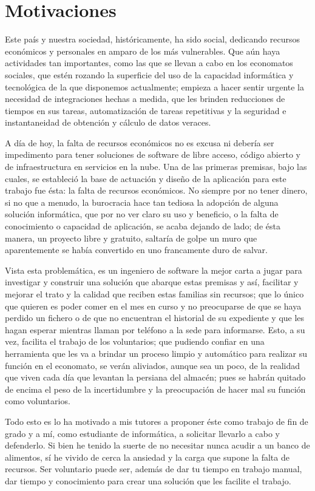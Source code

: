\section{Motivaciones}
Este país y nuestra sociedad, históricamente, ha sido social, dedicando recursos económicos y personales en amparo de los más vulnerables. Que aún haya actividades tan importantes, como las que se llevan a cabo en los economatos sociales, que estén rozando la superficie del uso de la capacidad informática y tecnológica de la que disponemos actualmente; empieza a hacer sentir urgente la necesidad de integraciones hechas a medida, que les brinden reducciones de tiempos en sus tareas, automatización de tareas repetitivas y la seguridad e instantaneidad de obtención y cálculo de datos veraces.
\vspace{1em}
\par A día de hoy, la falta de recursos económicos no es excusa ni debería ser impedimento para tener soluciones de software de libre acceso, código abierto y de infraestructura en servicios en la nube. Una de las primeras premisas, bajo las cuales, se estableció la base de actuación y diseño de la aplicación para este trabajo fue ésta: la falta de recursos económicos. No siempre por no tener dinero, si no que a menudo, la burocracia hace tan tediosa la adopción de alguna solución informática, que por no ver claro su uso y beneficio, o la falta de conocimiento o capacidad de
aplicación, se acaba dejando de lado; de ésta manera, un proyecto libre y gratuito, saltaría de golpe un muro que aparentemente se había convertido en uno francamente duro de salvar.
\vspace{1em}
\par Vista esta problemática, es un ingeniero de software la mejor carta a jugar para investigar y construir una solución que abarque estas premisas y así, facilitar y mejorar el trato y la calidad que reciben estas familias sin recursos; que lo único que quieren es poder comer en el mes en curso y no preocuparse de que se haya perdido un fichero o de que no encuentran el historial de su expediente y que les hagan esperar mientras llaman por teléfono a la sede para informarse.
Esto, a su vez, facilita el trabajo de los voluntarios; que pudiendo confiar en una herramienta que les va a brindar un proceso limpio y automático para realizar su función en el economato, se verán aliviados, aunque sea un poco, de la realidad que viven cada día que levantan la persiana del almacén; pues se habrán quitado de encima el peso de la incertidumbre y la preocupación de hacer mal
su función como voluntarios.
\vspace{1em}
\par Todo esto es lo ha motivado a mis tutores a proponer éste como trabajo de fin de grado y a mí, como estudiante de informática, a solicitar llevarlo a cabo y defenderlo. Si bien he tenido la suerte de no necesitar nunca acudir a un banco de alimentos, sí he vivido de cerca la ansiedad y la carga que supone la falta de recursos. Ser voluntario puede ser, además de dar tu tiempo en trabajo manual, dar tiempo y conocimiento para crear una solución que les facilite el trabajo.
\clearpage

